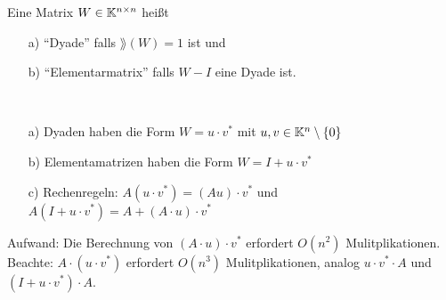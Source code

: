 \begin{Definition}
Eine Matrix $W \in \mathbb K^{n \times n}$ heißt
\begin{enumerate}
  \item[a)] "`Dyade"' falls $\rang(W) = 1$ ist und
  \item[b)] "`Elementarmatrix"' falls $W - I$ eine Dyade ist.
\end{enumerate}
\end{Definition}
\begin{Bemerkungen}
\quad \\
  \begin{enumerate}
    \item[a)] Dyaden haben die Form $W = u \cdot v^*$ mit $u, v \in \mathbb K^n\setminus \lbrace 0 \rbrace$
    \item[b)] Elementamatrizen haben die Form $W = I + u \cdot v^*$
    \item[c)] Rechenregeln: $A(u \cdot v^*) = (A u) \cdot v^*$ und
      $A (I + u \cdot v^*) = A + (A \cdot u) \cdot v^*$
  \end{enumerate}
Aufwand: Die Berechnung von $(A \cdot u) \cdot v^*$ erfordert $O(n^2)$ Mulitplikationen.
Beachte: $A\cdot (u \cdot v^*)$ erfordert $O(n^3)$ Mulitplikationen, analog
$u \cdot v^* \cdot A$ und $ (I + u \cdot v^*) \cdot A$.
\end{Bemerkungen}

